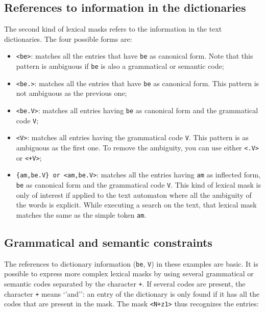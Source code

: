 \subsection{References to information in the dictionaries}


The second kind of lexical masks refers to the information in the
text dictionaries.
 The four possible forms are:

\bigskip
\begin{itemize}
  \item \verb+<be>+: matches all the entries that have \verb+be+ as canonical
  form. Note that this pattern is ambiguous if \verb+be+ is also a grammatical
  or semantic code;
  \item \verb+<be.>+: matches all the entries that have \verb+be+ as canonical
  form. This pattern is not ambiguous as the previous one;
  \item \verb+<be.V>+: matches all entries having \verb+be+ as canonical form
  and the grammatical code \verb+V+;
  \item \verb+<V>+: matches all entries having the grammatical code \verb+V+.
  This pattern is as ambiguous as the first one. To remove the ambiguity, you
  can use either \verb+<.V>+ or \verb$<+V>$; 
  \item \verb+{am,be.V} or <am,be.V>+: matches all the entries having
  \verb+am+ as inflected form, \verb+be+ as canonical form and the
  grammatical code \verb+V+. This kind of lexical mask is only of interest if applied
  to the text automaton where all the ambiguity of the words is explicit.
   While executing a
  search on the text, that lexical mask matches the same as the simple token
  \verb+am+.
\end{itemize}

\subsection{Grammatical and semantic constraints}

The references to dictionary information (\verb+be+, \verb+V+) in these examples
are basic. It is possible to express more complex lexical masks by using
several grammatical or semantic codes separated by the character \verb$+$.
If several codes are present, the character \verb$+$ means `'and'':
 an entry of the dictionary is only found if it has all the codes that are
present in the mask. The mask \verb$<N+z1>$ thus recognizes the entries:

